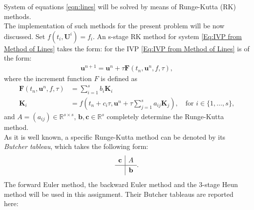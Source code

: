 \documentclass[11pt]{article}
\theoremstyle{theorem}
\theoremstyle{definition}
\begin{document}
System of equations \eqref{eqn:lines} will be solved by means of Runge-Kutta (RK) methods.\\
The implementation of such methods for the present problem will be now discussed. Set $ f(t_i,\mathbf{U}^i) = f_i $. An s-stage RK method for system \eqref{Eq:IVP from Method of Lines} takes the form:
for the IVP \eqref{Eq:IVP from Method of Lines} is of the form:
\begin{align*}
\mathbf{u}^{n+1} = \mathbf{u}^{n} + \tau \mathbf{F}(t_n, \mathbf{u}^n, f, \tau),
\end{align*}
where the increment function $ F $ is defined as
\begin{align*}
\mathbf{F}(t_n, \mathbf{u}^n, f, \tau) &= \sum_{i=1}^{s}b_i\mathbf{K}_i \\
\mathbf{K}_i &= f\left(t_n + c_i\tau, \mathbf{u}^n + \tau\sum_{j=1}^{s}a_{ij}\mathbf{K}_j\right), \quad \text{for } i \in \{1,\ldots,s\},
\end{align*}
and $ A = (a_{ij}) \in \mathbb{R}^{s \times s} $, $ \mathbf{b}, \mathbf{c} \in \mathbb{R}^s $ completely determine the Runge-Kutta method.\\
As it is well known, a specific Runge-Kutta method can be denoted by its \emph{Butcher tableau}, which takes the following form:
\begin{align*}
\renewcommand\arraystretch{1.2}
\begin{array}
{c|c}
\mathbf{c} &
A\\
\hline
& \mathbf{b}
\end{array}.
\end{align*}
The forward Euler method, the backward Euler method and the 3-stage Heun method will be used in this assignment. Their Butcher tableaus are reported here:
\end{document}

